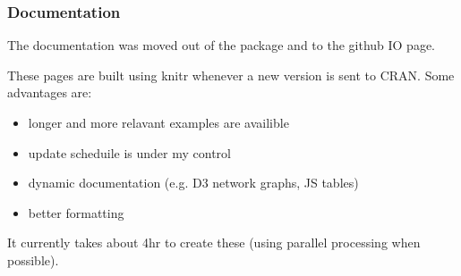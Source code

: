 \documentclass[12 pt]{beamer}\usepackage[]{graphicx}\usepackage[]{color}
\newcommand{\pkg}[1]{{\fontseries{b}\selectfont #1}}
\renewcommand{\pkg}[1]{{\color{darkgreen}\textsf{#1}}}
\begin{document}
  \begin{frame}[fragile]
\frametitle{Documentation}

The documentation was moved out of the package and to the github IO page. 

\vspace{.15in}


These pages are built using \pkg{knitr} whenever a new version is sent to CRAN. Some advantages are:

\begin{itemize}
\item longer and more relavant examples are availible
\item update scheduile is under my control
\item dynamic documentation (e.g. D3 network graphs, JS tables)
\item better formatting
\end{itemize}

\vspace{.1in}

It currently takes about 4hr to create these (using parallel processing when possible). 

\end{frame}
\end{document}
